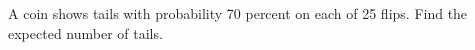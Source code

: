 A coin shows tails with probability 70 percent on each of 25 flips. Find the expected number of tails.
